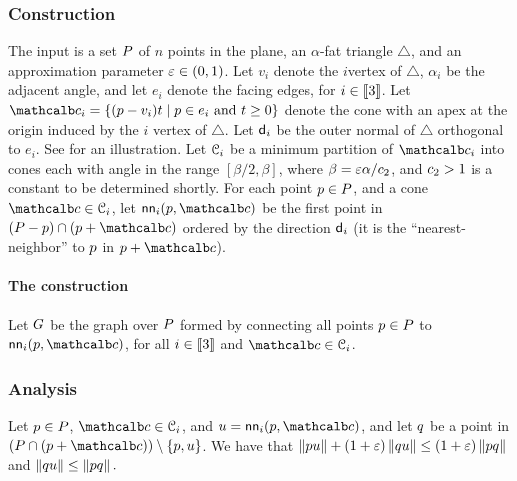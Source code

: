 \documentclass[12pt]{article}%
\begin{document}
\subsubsection{Construction}


The input is a set $P$ of $n$ points in the plane, an $\alpha$-fat
triangle $\triangle$, and an approximation parameter $\varepsilon \in
(0,1)$. Let $v_i$ denote the $i$\th vertex of $\triangle$, $\alpha_i$
be the adjacent angle, and let $e_i$ denote the facing edges, for
$i\in \IRX{3}$.  Let
$\cone_i = \Set{ (\pa - v_i)t }{ \pa \in e_i \text{ and } t \geq 0}$
denote the cone with an apex at the origin induced by the $i$\th
vertex of $\triangle$.  Let $\mathsf{d}_i$ be the outer normal of
$\triangle$ orthogonal to $e_i$.  See  for an
illustration. Let $\EuScript{C}_i$ be a minimum partition of $\cone_i$
into cones each with angle in the range $[\beta/2, \beta]$, where
$\beta = \varepsilon \alpha/c_2$, and $c_2>1$ is a constant to be
determined shortly.  For each point $p\in P$, and a cone
$\cone \in \ConeSet_i$, let $\nnZ{i}{\pa}{\cone}$ be the first point
in $(\PS - \pa)\cap ( \pa + \cone)$ ordered by the direction $\mathsf{d}_i$
(it is the ``nearest-neighbor'' to $p$ in $\pa+\cone$).



\paragraph{The construction}
Let $G$ be the graph over $P$ formed by connecting all points
$p \in P$ to $\nnZ{i}{\pa}{\cone}$, for all $i \in \IRX{3}$ and
$\cone \in \ConeSet_i$.




\subsubsection{Analysis}


\begin{lemma}
    Let $p \in P$, $\cone \in \ConeSet_i$, and
    $\pc =\nnZ{i}{\pa}{\cone}$, and let $q$ be a point in
    $(\PS \cap (\pa + \cone)) \setminus \{\pa, \pc\}$.
    We have that 
    \begin{math}
        \dY{\pa}{\pc}%
        +%
        (1+\eps)\dY{\pb}{\pc}%
        \leq%
        (1+\eps)\dY{\pa}{\pb}
    \end{math}
    and 
    \begin{math}
        \dY{\pb}{\pc}%
        \leq%
        \dY{\pa}{\pb}.
    \end{math}
\end{lemma}
\end{document}
